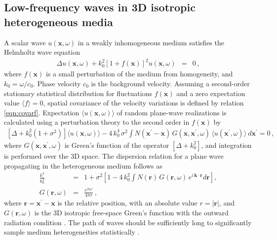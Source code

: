 \subsection{Low-frequency waves in 3D isotropic heterogeneous media}


A scalar wave $u(\mathbf{x},\omega)$ in a weakly inhomogeneous medium 
\cite[]{Chernov_60,Tatarski_61,Karal_K64}
satisfies the Helmholtz wave equation\,
\begin{eqnarray}
\Delta u(\mathbf{x},\omega) + k_0^2\left[1+f(\mathbf{x})\right]^2u(\mathbf{x},\omega) & = & 0\,, \label{eqn:helmh}
\end{eqnarray}
where $f(\mathbf{x})$ is a small perturbation of the medium from homogeneity, and $k_0=\omega/c_0$.
Phase velocity $c_0$ is the background velocity.
Assuming a second-order stationary statistical distribution 
for fluctuations $f(\mathbf{x})$ and a zero expectation value $\langle f \rangle = 0$, spatial covariance of the velocity variations is
defined by relation \ref{eqn:covarf}.
Expectation $\langle u(\mathbf{x},\omega)\rangle$ of random plane-wave realizations
is calculated \cite[]{Karal_K64} 
using a perturbation theory to the second order in $f(\mathbf{x})$ by
\begin{eqnarray}
\left[\Delta+k_0^2(1+\sigma^2)\right]\langle u(\mathbf{x},\omega)\rangle -
4\,k_0^4\,\sigma^2\int N(\mathbf{x}^{\prime}-\mathbf{x})\,G(\mathbf{x},\mathbf{x}^{\prime},\omega)
\,\langle u(\mathbf{x}^{\prime},\omega)\rangle~d\mathbf{x}^{\prime}= 0\,,
\end{eqnarray}
where $G(\mathbf{x},\mathbf{x}^{\prime},\omega)$ is Green's function of the operator $\left[\Delta+k_0^2\right]$,
and integration is performed over the 3D space.
The dispersion relation for a plane wave propagating in the heterogeneous medium follows as
\begin{eqnarray}
\frac{k^2}{k_0^2} & = & 1 + \sigma^2\left[1 - 4\,k_0^2
\int N(\mathbf{r})\,G(\mathbf{r},\omega)\,e^{i\,\mathbf{k}\cdot\mathbf{r}}d\mathbf{r}\right], \label{eqn:dispersg}\\
G(\mathbf{r},\omega) & = & \frac{e^{ik_0r}}{4\pi r}\,,\label{eqn:green3d}
\end{eqnarray}
where $\mathbf{r} = \mathbf{x}^{\prime}-\mathbf{x}$ is the relative position, with an absolute value $r=|\mathbf{r}|$,
and $G(\mathbf{r},\omega)$ is the 3D isotropic free-space Green's function with the outward radiation condition 
\cite[]{Bleistein_CS01}.
The path of waves should be sufficiently long to significantly sample medium heterogeneities statistically \cite[]{Gist_94}.
